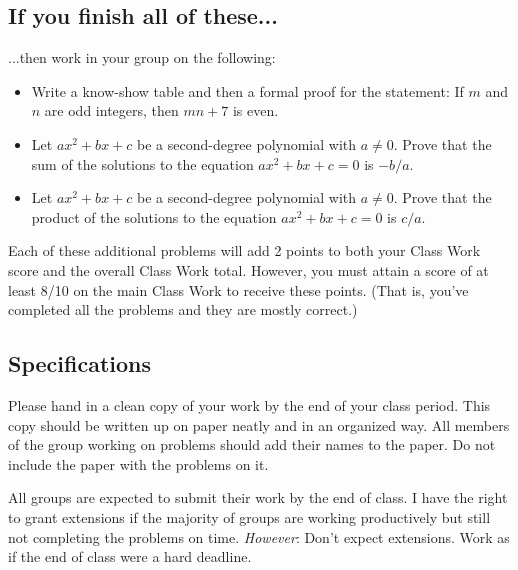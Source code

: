 \documentclass[11pt]{article}
\begin{document}
\subsection*{If you finish all of these...}

...then work in your group on the following: 
\begin{itemize}
	\item Write a know-show table and then a formal proof for the statement: If $m$ and $n$ are odd integers, then $mn+7$ is even. 
	\item Let $ax^2 + bx + c$ be a second-degree polynomial with $a \neq 0$. Prove that the sum of the solutions to the equation $ax^2 + bx + c = 0$ is $-b/a$. 
	\item Let $ax^2 + bx + c$ be a second-degree polynomial with $a \neq 0$. Prove that the product of the solutions to the equation $ax^2 + bx + c = 0$ is $c/a$. 
\end{itemize}
Each of these additional problems will add 2 points to both your Class Work score and the overall Class Work total. However, you must attain a score of at least 8/10 on the main Class Work to receive these points. (That is, you've completed all the problems and they are mostly correct.) 	
	
	
\subsection*{Specifications}

Please hand in a clean copy of your work by the end of your class period. This copy should be written up on paper neatly and in an organized way. All members of the group working on problems should add their names to the paper. Do not include the paper with the problems on it. 

All groups are expected to submit their work by the end of class. I have the right to grant extensions if the majority of groups are working productively but still not completing the problems on time. \emph{However}: Don't expect extensions. Work as if the end of class were a hard deadline. 
\end{document}
